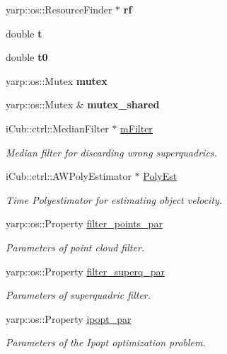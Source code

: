 \begin{DoxyCompactItemize}
\mbox{\label{classSuperqComputation_a814b2ae62e40b9bafd51f18241ff68f8}} 
yarp\+::os\+::\+Resource\+Finder $\ast$ {\bfseries rf}
\item 
\mbox{\label{classSuperqComputation_ab63b4c30d44582586da1951852293271}} 
double {\bfseries t}
\item 
\mbox{\label{classSuperqComputation_ac144b5fb4a510155a31b8bdc84d31a4b}} 
double {\bfseries t0}
\item 
\mbox{\label{classSuperqComputation_a29404ed2e8aefeea9d130fd593ffba04}} 
yarp\+::os\+::\+Mutex {\bfseries mutex}
\item 
\mbox{\label{classSuperqComputation_ae6f9649303ef83c6f237cbeafe925504}} 
yarp\+::os\+::\+Mutex \& {\bfseries mutex\+\_\+shared}
\item 
\mbox{\label{classSuperqComputation_a3f68fd1573d593f8c2e31a24b5fecd62}} 
i\+Cub\+::ctrl\+::\+Median\+Filter $\ast$ \mbox{\hyperlink{classSuperqComputation_a3f68fd1573d593f8c2e31a24b5fecd62}{m\+Filter}}
\begin{DoxyCompactList}\small\item\em Median filter for discarding wrong superquadrics. \end{DoxyCompactList}\item 
\mbox{\label{classSuperqComputation_a6376183a329639f4f2f65affa5984dab}} 
i\+Cub\+::ctrl\+::\+A\+W\+Poly\+Estimator $\ast$ \mbox{\hyperlink{classSuperqComputation_a6376183a329639f4f2f65affa5984dab}{Poly\+Est}}
\begin{DoxyCompactList}\small\item\em Time Polyestimator for estimating object velocity. \end{DoxyCompactList}\item 
\mbox{\label{classSuperqComputation_a2bedeac86517b9c75f5ab2bd82fec336}} 
yarp\+::os\+::\+Property \mbox{\hyperlink{classSuperqComputation_a2bedeac86517b9c75f5ab2bd82fec336}{filter\+\_\+points\+\_\+par}}
\begin{DoxyCompactList}\small\item\em Parameters of point cloud filter. \end{DoxyCompactList}\item 
\mbox{\label{classSuperqComputation_abdb75d518be9b5af47732389076e59b1}} 
yarp\+::os\+::\+Property \mbox{\hyperlink{classSuperqComputation_abdb75d518be9b5af47732389076e59b1}{filter\+\_\+superq\+\_\+par}}
\begin{DoxyCompactList}\small\item\em Parameters of superquadric filter. \end{DoxyCompactList}\item 
\mbox{\label{classSuperqComputation_a22a31f157e5d1978e82ee5001e57b72c}} 
yarp\+::os\+::\+Property \mbox{\hyperlink{classSuperqComputation_a22a31f157e5d1978e82ee5001e57b72c}{ipopt\+\_\+par}}
\begin{DoxyCompactList}\small\item\em Parameters of the Ipopt optimization problem. \end{DoxyCompactList}\end{DoxyCompactItemize}


